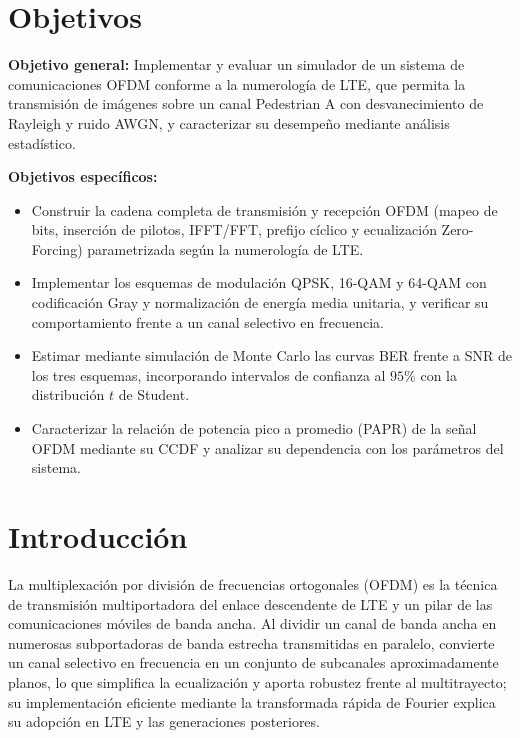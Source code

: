 \documentclass[conference,onecolumn]{IEEEtran}
\begin{document}
\section*{Objetivos}

\textbf{Objetivo general:} Implementar y evaluar un simulador de un sistema de comunicaciones OFDM conforme a la numerolog\'ia de LTE, que permita la transmisi\'on de im\'agenes sobre un canal Pedestrian A con desvanecimiento de Rayleigh y ruido AWGN, y caracterizar su desempe\~no mediante an\'alisis estad\'istico.

\textbf{Objetivos espec\'ificos:}
\begin{itemize}
    \item Construir la cadena completa de transmisi\'on y recepci\'on OFDM (mapeo de bits, inserci\'on de pilotos, IFFT/FFT, prefijo c\'iclico y ecualizaci\'on Zero-Forcing) parametrizada seg\'un la numerolog\'ia de LTE.
    \item Implementar los esquemas de modulaci\'on QPSK, 16-QAM y 64-QAM con codificaci\'on Gray y normalizaci\'on de energ\'ia media unitaria, y verificar su comportamiento frente a un canal selectivo en frecuencia.
    \item Estimar mediante simulaci\'on de Monte Carlo las curvas BER frente a SNR de los tres esquemas, incorporando intervalos de confianza al $95\%$ con la distribuci\'on $t$ de Student.
    \item Caracterizar la relaci\'on de potencia pico a promedio (PAPR) de la se\~nal OFDM mediante su CCDF y analizar su dependencia con los par\'ametros del sistema.
\end{itemize}

\section{Introducci\'on}

La multiplexaci\'on por divisi\'on de frecuencias ortogonales (OFDM) es la t\'ecnica de transmisi\'on multiportadora del enlace descendente de LTE y un pilar de las comunicaciones m\'oviles de banda ancha. Al dividir un canal de banda ancha en numerosas subportadoras de banda estrecha transmitidas en paralelo, convierte un canal selectivo en frecuencia en un conjunto de subcanales aproximadamente planos, lo que simplifica la ecualizaci\'on y aporta robustez frente al multitrayecto; su implementaci\'on eficiente mediante la transformada r\'apida de Fourier explica su adopci\'on en LTE y las generaciones posteriores.
\end{document}
